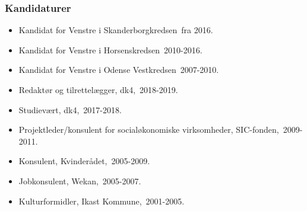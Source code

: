 \documentclass[11pt, a4paper]{awesome-cv}
\begin{document}
\begin{cvletter}
\subsubsection*{Kandidaturer}
\begin{itemize}
\item Kandidat for Venstre i Skanderborgkredsen fra 2016.
\item Kandidat for Venstre i Horsenskredsen 2010-2016.
\item Kandidat for Venstre i Odense Vestkredsen 2007-2010.
\end{itemize}
\begin{itemize}
\item Redaktør og tilrettelægger, dk4, 2018-2019.
\item Studievært, dk4, 2017-2018.
\item Projektleder/konsulent for socialøkonomiske virksomheder, SIC-fonden, 2009-2011.
\item Konsulent, Kvinderådet, 2005-2009.
\item Jobkonsulent, Wekan, 2005-2007.
\item Kulturformidler, Ikast Kommune, 2001-2005.
\end{itemize}
\end{cvletter}
\end{document}
